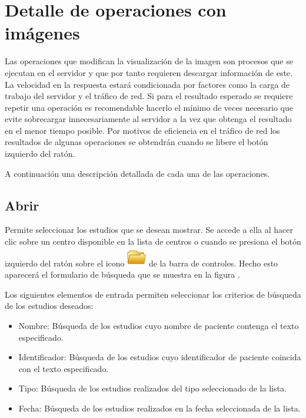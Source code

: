 \documentclass{plantilla-manual-usuario}
\begin{document}
\section{Detalle de operaciones con imágenes}

Las operaciones que modifican la visualización de la imagen son procesos que se ejecutan en el servidor y que por tanto requieren descargar información de este. La velocidad en la respuesta estará condicionada por factores como la carga de trabajo del servidor y el tráfico de red. Si para el resultado esperado se requiere repetir una operación es recomendable hacerlo el mínimo de veces necesario que evite sobrecargar innecesariamente al servidor a la vez que obtenga el resultado en el menor tiempo posible. Por motivos de eficiencia en el tráfico de red los resultados de algunas operaciones se obtendrán cuando se libere el botón izquierdo del ratón.   

A continuación una descripción detallada de cada una de las operaciones.

\subsection{Abrir}\label{sectionAbrir}

Permite seleccionar los estudios que se desean mostrar. Se accede a ella al hacer clic sobre un centro disponible en la lista de centros o cuando se presiona el botón izquierdo del ratón sobre el icono \includegraphics[scale=0.5]{images/open.png} de la barra de controles. Hecho esto aparecerá el formulario de búsqueda que se muestra en la figura . 


Los siguientes elementos de entrada permiten seleccionar los criterios de búsqueda de los estudios deseados:

\begin{itemize}
\item Nombre: Búsqueda de los estudios cuyo nombre de paciente contenga el texto especificado. 
\item Identificador: Búsqueda de los estudios cuyo identificador de paciente coincida con el texto especificado.
\item Tipo: Búsqueda de los estudios realizados del tipo seleccionado de la lista.
\item Fecha: Búsqueda de los estudios realizados en la fecha seleccionada de la lista. 
\end{itemize}
\end{document}
